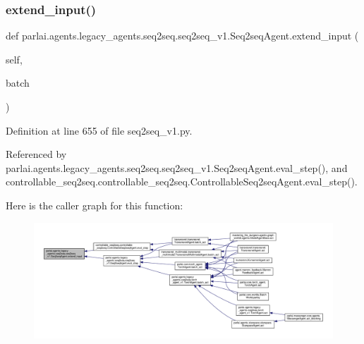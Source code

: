 \subsubsection{\texorpdfstring{extend\+\_\+input()}{extend\_input()}}
{\footnotesize\ttfamily def parlai.\+agents.\+legacy\+\_\+agents.\+seq2seq.\+seq2seq\+\_\+v1.\+Seq2seq\+Agent.\+extend\+\_\+input (\begin{DoxyParamCaption}\item[{}]{self,  }\item[{}]{batch }\end{DoxyParamCaption})}



Definition at line 655 of file seq2seq\+\_\+v1.\+py.



Referenced by parlai.\+agents.\+legacy\+\_\+agents.\+seq2seq.\+seq2seq\+\_\+v1.\+Seq2seq\+Agent.\+eval\+\_\+step(), and controllable\+\_\+seq2seq.\+controllable\+\_\+seq2seq.\+Controllable\+Seq2seq\+Agent.\+eval\+\_\+step().

Here is the caller graph for this function\+:
\nopagebreak
\begin{figure}[H]
\begin{center}
\leavevmode
\includegraphics[width=350pt]{classparlai_1_1agents_1_1legacy__agents_1_1seq2seq_1_1seq2seq__v1_1_1Seq2seqAgent_aa1e972eb8a41c98486a50baa14700345_icgraph}
\end{center}
\end{figure}
\mbox{\label{classparlai_1_1agents_1_1legacy__agents_1_1seq2seq_1_1seq2seq__v1_1_1Seq2seqAgent_a6afc143cc0ec59803be416416ce1ec97}} 
